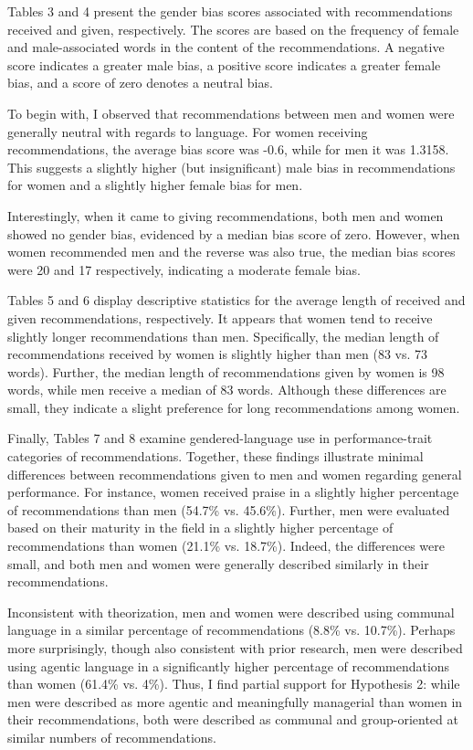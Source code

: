 \documentclass[12pt]{caltech_thesis}
\begin{document}
Tables 3 and 4 present the gender bias scores associated with recommendations received and given, respectively. The scores are based on the frequency of female and male-associated words in the content of the recommendations. A negative score indicates a greater male bias, a positive score indicates a greater female bias, and a score of zero denotes a neutral bias.

To begin with, I observed that recommendations between men and women were generally neutral with regards to language. For women receiving recommendations, the average bias score was -0.6, while for men it was 1.3158. This suggests a slightly higher (but insignificant) male bias in recommendations for women and a slightly higher female bias for men.

Interestingly, when it came to giving recommendations, both men and women showed no gender bias, evidenced by a median bias score of zero. However, when women recommended men and the reverse was also true, the median bias scores were 20 and 17 respectively, indicating a moderate female bias.

Tables 5 and 6 display descriptive statistics for the average length of received and given recommendations, respectively. It appears that women tend to receive slightly longer recommendations than men. Specifically, the median length of recommendations received by women is slightly higher than men (83 vs. 73 words). Further, the median length of recommendations given by women is 98 words, while men receive a median of 83 words. Although these differences are small, they indicate a slight preference for long recommendations among women.

Finally, Tables 7 and 8 examine gendered-language use in performance-trait categories of recommendations. Together, these findings illustrate minimal differences between recommendations given to men and women regarding general performance. For instance, women received praise in a slightly higher percentage of recommendations than men (54.7\% vs. 45.6\%). Further, men were evaluated based on their maturity in the field in a slightly higher percentage of recommendations than women (21.1\% vs. 18.7\%). Indeed, the differences were small, and both men and women were generally described similarly in their recommendations. 

Inconsistent with theorization, men and women were described using communal language in a similar percentage of recommendations (8.8\% vs. 10.7\%).  Perhaps more surprisingly, though also consistent with prior research, men were described using agentic language in a significantly higher percentage of recommendations than women (61.4\% vs. 4\%). Thus, I find partial support for Hypothesis 2: while men were described as more agentic and meaningfully managerial than women in their recommendations, both were described as communal and group-oriented at similar numbers of recommendations.
\end{document}
